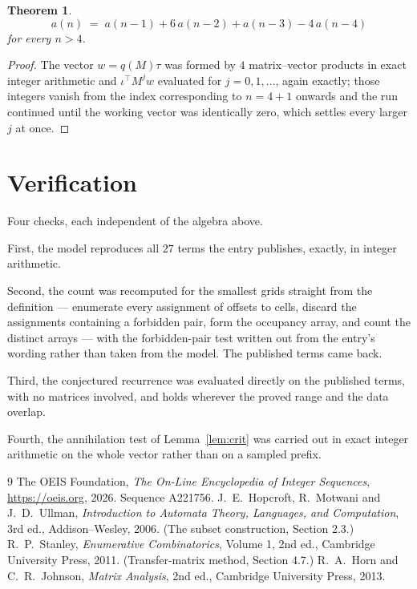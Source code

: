 \documentclass[11pt,a4paper]{article}
\theoremstyle{plain}
\newtheorem{theorem}{Theorem}
\theoremstyle{definition}
\begin{document}
\begin{theorem}
\[
a(n)\;=\;a(n-1) + 6\,a(n-2) + a(n-3) - 4\,a(n-4)
\]
for every $n>4$.
\end{theorem}

\begin{proof}
The vector $w=q(M)\tau$ was formed by $4$ matrix--vector products in exact integer
arithmetic and $\iota^{\!\top}M^{j}w$ evaluated for $j=0,1,\dots$, again exactly; those
integers vanish from the index corresponding to $n=4+1$ onwards and the run continued
until the working vector was identically zero, which settles every larger $j$ at once.
\end{proof}

\section{Verification}

Four checks, each independent of the algebra above.

First, the model reproduces all $27$ terms the entry publishes, exactly, in integer
arithmetic.

Second, the count was recomputed for the smallest grids straight from the definition ---
enumerate every assignment of offsets to cells, discard the assignments containing a forbidden
pair, form the occupancy array, and count the distinct arrays --- with the forbidden-pair test
written out from the entry's wording rather than taken from the model. The published terms
came back.

Third, the conjectured recurrence was evaluated directly on the published terms, with no
matrices involved, and holds wherever the proved range and the data overlap.

Fourth, the annihilation test of Lemma~\ref{lem:crit} was carried out in exact integer
arithmetic on the whole vector rather than on a sampled prefix.

\begin{thebibliography}{9}
 The OEIS Foundation, \emph{The On-Line Encyclopedia of Integer
Sequences}, \url{https://oeis.org}, 2026. Sequence A221756.
 J.~E.~Hopcroft, R.~Motwani and J.~D.~Ullman, \emph{Introduction to Automata
Theory, Languages, and Computation}, 3rd ed., Addison--Wesley, 2006. (The subset
construction, Section 2.3.)
 R.~P.~Stanley, \emph{Enumerative Combinatorics}, Volume 1, 2nd ed.,
Cambridge University Press, 2011. (Transfer-matrix method, Section 4.7.)
 R.~A.~Horn and C.~R.~Johnson, \emph{Matrix Analysis}, 2nd ed., Cambridge
University Press, 2013.
\end{thebibliography}
\end{document}
